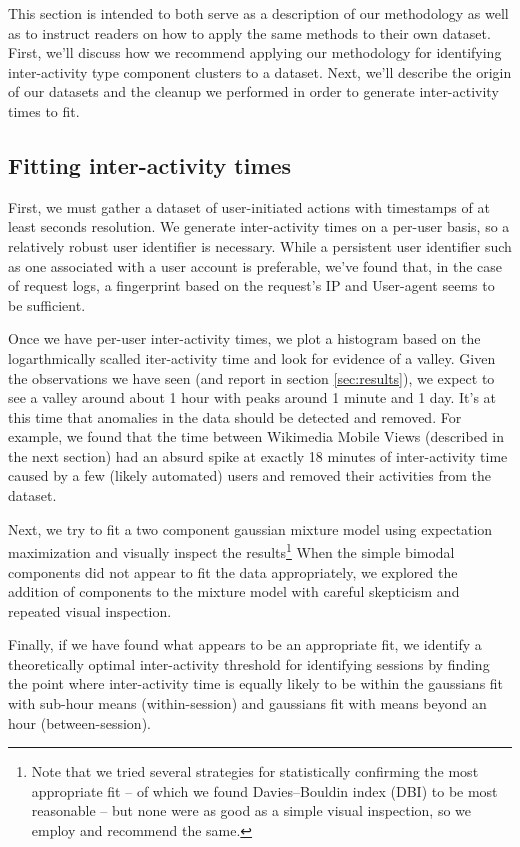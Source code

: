 This section is intended to both serve as a description of our methodology as well as to instruct readers on how to apply the same methods to their own dataset.  First, we'll discuss how we recommend applying our methodology for identifying inter-activity type component clusters to a dataset.  Next, we'll describe the origin of our datasets and the cleanup we performed in order to generate inter-activity times to fit.

\subsection{Fitting inter-activity times}
First, we must gather a dataset of user-initiated actions with timestamps of at least seconds resolution.  We generate inter-activity times on a per-user basis, so a relatively robust user identifier is necessary.  While a persistent user identifier such as one associated with a user account is preferable, we've found that, in the case of request logs, a fingerprint based on the request's IP and User-agent seems to be sufficient.

Once we have per-user inter-activity times, we plot a histogram based on the logarthmically scalled iter-activity time and look for evidence of a valley.  Given the observations we have seen (and report in section \ref{sec:results}), we expect to see a valley around about 1 hour with peaks around 1 minute and 1 day.  It's at this time that anomalies in the data should be detected and removed.  For example, we found that the time between Wikimedia Mobile Views (described in the next section) had an absurd spike at exactly 18 minutes of inter-activity time caused by a few (likely automated) users and removed their activities from the dataset.

Next, we try to fit a two component gaussian mixture model using expectation maximization\cite{benaglia2009mixtools} and visually inspect the results\footnote{Note that we tried several strategies for statistically confirming the most appropriate fit -- of which we found Davies--Bouldin index (DBI)\cite{davies1979cluster} to be most reasonable -- but none were as good as a simple visual inspection, so we employ and recommend the same.}  When the simple bimodal components did not appear to fit the data appropriately, we explored the addition of components to the mixture model with careful skepticism and repeated visual inspection.

Finally, if we have found what appears to be an appropriate fit, we identify a theoretically optimal inter-activity threshold for identifying sessions by finding the point where inter-activity time is equally likely to be within the gaussians fit with sub-hour means (within-session) and gaussians fit with means beyond an hour (between-session).

